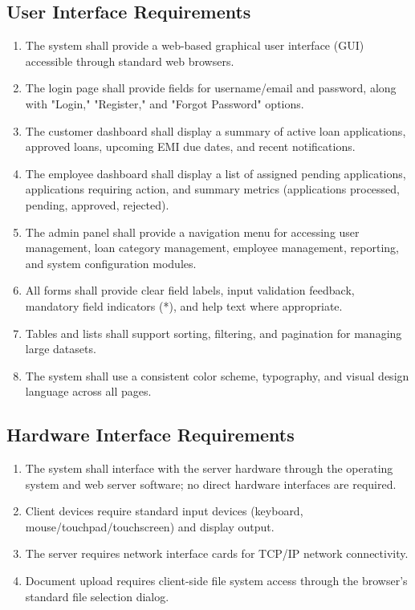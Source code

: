 \documentclass[12pt,a4paper,oneside]{report}
\begin{document}
\subsection{User Interface Requirements}

\begin{enumerate}
  \item The system shall provide a web-based graphical user interface (GUI) accessible through standard web browsers.
  \item The login page shall provide fields for username/email and password, along with "Login," "Register," and "Forgot Password" options.
  \item The customer dashboard shall display a summary of active loan applications, approved loans, upcoming EMI due dates, and recent notifications.
  \item The employee dashboard shall display a list of assigned pending applications, applications requiring action, and summary metrics (applications processed, pending, approved, rejected).
  \item The admin panel shall provide a navigation menu for accessing user management, loan category management, employee management, reporting, and system configuration modules.
  \item All forms shall provide clear field labels, input validation feedback, mandatory field indicators (*), and help text where appropriate.
  \item Tables and lists shall support sorting, filtering, and pagination for managing large datasets.
  \item The system shall use a consistent color scheme, typography, and visual design language across all pages.
\end{enumerate}

\subsection{Hardware Interface Requirements}

\begin{enumerate}
  \item The system shall interface with the server hardware through the operating system and web server software; no direct hardware interfaces are required.
  \item Client devices require standard input devices (keyboard, mouse/touchpad/touchscreen) and display output.
  \item The server requires network interface cards for TCP/IP network connectivity.
  \item Document upload requires client-side file system access through the browser's standard file selection dialog.
\end{enumerate}
\end{document}
